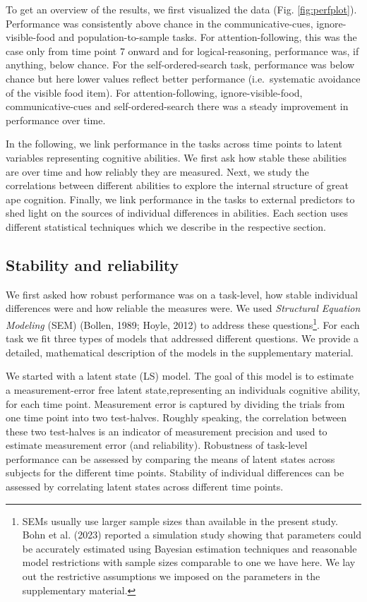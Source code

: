 \documentclass[
  man,floatsintext]{apa6}
\begin{document}
To get an overview of the results, we first visualized the data (Fig. \ref{fig:perfplot}). Performance was consistently above chance in the communicative-cues, ignore-visible-food and population-to-sample tasks. For attention-following, this was the case only from time point 7 onward and for logical-reasoning, performance was, if anything, below chance. For the self-ordered-search task, performance was below chance but here lower values reflect better performance (i.e.~systematic avoidance of the visible food item). For attention-following, ignore-visible-food, communicative-cues and self-ordered-search there was a steady improvement in performance over time.

In the following, we link performance in the tasks across time points to latent variables representing cognitive abilities. We first ask how stable these abilities are over time and how reliably they are measured. Next, we study the correlations between different abilities to explore the internal structure of great ape cognition. Finally, we link performance in the tasks to external predictors to shed light on the sources of individual differences in abilities. Each section uses different statistical techniques which we describe in the respective section.

\hypertarget{stability-and-reliability}{%
\subsection{Stability and reliability}\label{stability-and-reliability}}

We first asked how robust performance was on a task-level, how stable individual differences were and how reliable the measures were. We used \emph{Structural Equation Modeling} (SEM) (Bollen, 1989; Hoyle, 2012) to address these questions\footnote{SEMs usually use larger sample sizes than available in the present study. Bohn et al. (2023) reported a simulation study showing that parameters could be accurately estimated using Bayesian estimation techniques and reasonable model restrictions with sample sizes comparable to one we have here. We lay out the restrictive assumptions we imposed on the parameters in the supplementary material.}. For each task we fit three types of models that addressed different questions. We provide a detailed, mathematical description of the models in the supplementary material.

We started with a latent state (LS) model. The goal of this model is to estimate a measurement-error free latent state,representing an individuals cognitive ability, for each time point. Measurement error is captured by dividing the trials from one time point into two test-halves. Roughly speaking, the correlation between these two test-halves is an indicator of measurement precision and used to estimate measurement error (and reliability). Robustness of task-level performance can be assessed by comparing the means of latent states across subjects for the different time points. Stability of individual differences can be assessed by correlating latent states across different time points.
\end{document}
